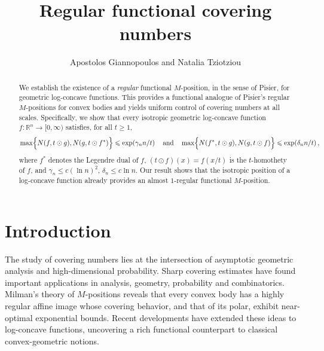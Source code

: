 \documentclass[11pt,leqno]{article}
\theoremstyle{definition}
\theoremstyle{remark}
\numberwithin{equation}{section}
\newcommand{\ls}{\leqslant}
\newcommand{\gr}{\geqslant}
\begin{document}
\small

\title{\bf Regular functional covering numbers}

\author{Apostolos Giannopoulos and Natalia Tziotziou}

\date{}

\maketitle

\begin{abstract}
\footnotesize We establish the existence of a \emph{regular} functional $M$-position, in the sense of Pisier, for geometric log-concave functions. This provides a functional analogue of Pisier's regular $M$-positions for convex bodies and yields uniform control of covering numbers at all scales. Specifically, we show that every isotropic geometric log-concave function $f:\mathbb{R}^n \to [0,\infty)$ satisfies, for all $t\gr 1$,
$$\max\Bigl\{N(f,t\odot g),N(g,t\odot f^{\ast})\Bigr\}\ls\exp\!\left(\gamma_{n} n/t\right)\quad\text{and}\quad  
\max\Bigl\{N(f^{\ast},t\odot g),N(g,t\odot f)\Bigr\}\ls\exp\!\left(\delta_{n} n/t\right),$$
where $f^{\ast}$ denotes the Legendre dual of $f$, $(t\odot f)(x)=f(x/t)$ is the $t$-homothety of $f$, and $\gamma_n \ls c(\ln n)^2$, $\delta_n\ls c\ln n$. Our result shows that the isotropic position of a log-concave function already provides an almost $1$-regular functional $M$-position.
\end{abstract}


\section{Introduction}\label{section-1}

The study of covering numbers lies at the intersection of asymptotic geometric analysis and
high-dimensional probability. Sharp covering estimates have found important applications
in analysis, geometry, probability and combinatorics. Milman's theory of $M$-positions reveals 
that every convex body has a highly regular affine image whose covering behavior, and that of its polar, exhibit
near-optimal exponential bounds. Recent developments have extended these ideas to log-concave functions,
uncovering a rich functional counterpart to classical convex-geometric notions.
\end{document}
